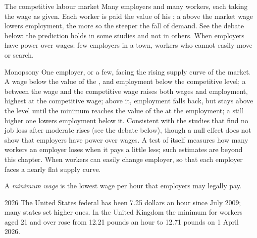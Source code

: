 \begin{model}{The competitive labour market}
\assumes Many employers and many workers, each taking the wage as given.
\predicts Each worker is paid the value of his ; a  above the market wage lowers employment, the more so the steeper the fall of demand.
\tested See the debate below: the prediction holds in some studies and not in others.
\breaks When employers have power over wages: few employers in a town, workers who cannot easily move or search.
\end{model}

\begin{model}{Monopsony}
\assumes One employer, or a few, facing the rising supply curve of the market.
\predicts A wage below the value of the , and employment below the competitive level; a  between the  wage and the competitive
  wage raises both wages and employment, highest at the competitive wage; above it, employment falls back, but stays above the  level
  until the minimum reaches the value of the  at the  employment; a still higher one lowers employment below it.
\tested Consistent with the studies that find no job loss after moderate rises (see the debate below), though a null effect does not show that
  employers have power over wages. A test of  itself measures how many workers an employer loses when it pays a little less; such
  estimates are beyond this chapter.
\breaks When workers can easily change employer, so that each employer faces a nearly flat supply curve.
\end{model}

\begin{definition}\label{def:g11:labour-market:minimum-wage}
A \emph{minimum wage} is the lowest wage per hour that employers may legally pay.
\end{definition}

\begin{dated}{2026}
The United States federal  has been 7.25 dollars an hour since July 2009; many states set higher ones. In the United Kingdom the minimum for workers aged 21
and over rose from 12.21 pounds an hour to 12.71 pounds on 1 April 2026.
\end{dated}


